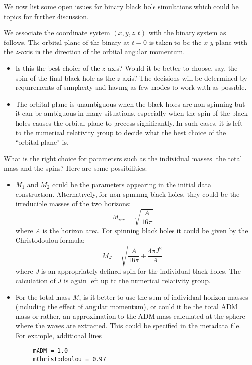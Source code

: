 \documentclass[prd,preprintnumbers,superscriptaddress,eqsecnum]{revtex4}
\numberwithin{equation}{section}
\begin{document}
We now list some open issues for binary black hole simulations which
could be topics for further discussion.

We associate the coordinate system $(x,y,z,t)$ with the binary system
as follows.  The orbital plane of the binary at $t=0$ is taken to be
the $x$-$y$ plane with the $z$-axis in the direction of the orbital
angular momentum.
\begin{itemize}
\item Is this the best choice of the $z$-axis?  Would it be better to
  choose, say, the spin of the final black hole as the $z$-axis? The
  decisions will be determined by requirements of simplicity and
  having as few modes to work with as possible.
\item The orbital plane is unambiguous when the black holes are non-spinning
  but it can be ambiguous in many situations, especially when the spin
  of the black holes causes the orbital plane to precess significantly.
  In such cases, it is left to the numerical relativity group to decide
  what the best choice of the ``orbital plane'' is. 
\end{itemize}
What is the right choice for parameters such as the individual masses,
the total mass and the spins?  Here are some possibilities:
\begin{itemize}
\item $M_1$ and $M_2$ could be the parameters appearing in the initial
  data construction.  Alternatively, for non spinning black holes,
  they could be the irreducible masses of the two horizons:
  \begin{equation}
    \label{eq:12}
    M_{irr} = \sqrt{\frac{A}{16\pi}}
  \end{equation}
  where $A$ is the horizon area.  For spinning black holes it could be
  given by the Christodoulou formula:
  \begin{equation}
    \label{eq:13}
    M_{J} = \sqrt{\frac{A}{16\pi} + \frac{4\pi J^2}{A}}
  \end{equation}
  where $J$ is an appropriately defined spin for the individual black
  holes.  The calculation of $J$ is again left up to the numerical
  relativity group.
\item For the total mass $M$, is it better to use the sum of individual
  horizon masses (including the effect of angular momentum), or could
  it be the total ADM mass or rather, an approximation to the ADM mass
  calculated at the sphere where the waves are extracted.  This could
  be specified in the metadata file.  For example, additional lines
  \begin{verbatim}
     mADM = 1.0
     mChristodoulou = 0.97
  \end{verbatim}
\end{itemize}
\end{document}
